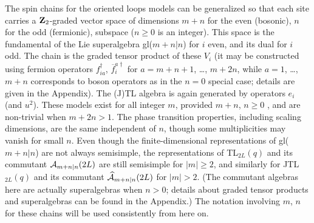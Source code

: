 \documentclass[twocolumn,floats,pra]{revtex4}
\def \cA {{\cal A}}
\def \hcA {\widehat{\cal A}}
\begin{document}
The spin chains for the oriented loops models can be generalized
so that each site carries a ${\bf Z}_2$-graded vector space of
dimensions $m+n$ for the even (bosonic), $n$ for the odd
(fermionic), subspace ($n\geq 0$ is an integer). This space is the
fundamental of the Lie superalgebra gl($m+n|n$) for $i$ even, and
its dual for $i$ odd. The chain is the graded tensor product of
these $V_i$ (it may be constructed \cite{rs} using fermion
operators $f^\dagger_{ia}$, $\overline{f}^{a\dagger}_i$ for
$a=m+n+1$, \ldots, $m+2n$, while $a=1$, \ldots, $m+n$ corresponds
to boson operators as in the $n=0$ special case; details are given
in the Appendix). The (J)TL algebra is again generated by
operators $e_i$ (and $u^2$). These models exist for all integer
$m$, provided $m+n$, $n\geq 0$ \cite{m=0}, and are non-trivial
when $m+2n>1$. The phase transition properties, including scaling
dimensions, are the same independent of $n$, though some
multiplicities may vanish for small $n$. Even though the
finite-dimensional representations of gl($m+n|n$) are not always
semisimple, the representations of TL$_{2L}(q)$ and its commutant
$\cA_{m+n|n}(2L)$ are still semisimple for $|m|\geq 2$, and
similarly for JTL$_{2L}(q)$ and its commutant $\hcA_{m+n|n}(2L)$
for $|m|>2$. (The commutant algebras here are actually
superalgebras when $n>0$; details about graded tensor products and
superalgebras can be found in the Appendix.) The notation
involving $m$, $n$ for these chains will be used consistently from
here on.
\end{document}
